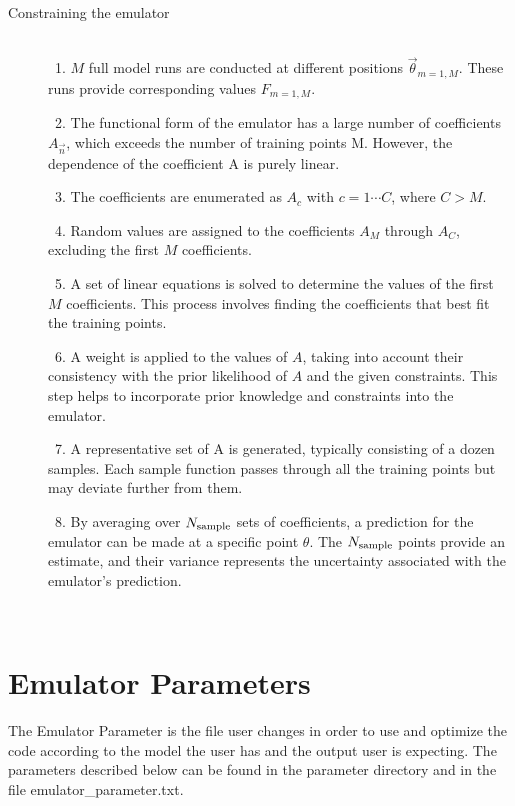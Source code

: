 \documentclass[12pt]{article}
\numberwithin{equation}{section}
\numberwithin{figure}{section}
\begin{document}
\begin{description}
\item[Constraining the emulator] \
\\
\ 1. $M$ full model runs are conducted at different positions $\vec{\theta}_{m=1,M}$. These runs provide corresponding values $F_{m=1,M}$. 

\ 2. The functional form of the emulator has a large number of coefficients $A_{\vec{n}}$, which exceeds the number of training points M. However, the dependence of the coefficient A is purely linear. 

\ 3. The coefficients are enumerated as $A_c$ with $c=1\cdots C$, where $C>M$.

\ 4. Random values are assigned to the coefficients $A_M$ through $A_C$, excluding the first $M$ coefficients. 

\ 5. A set of linear equations is solved to determine the values of the first $M$ coefficients. This process involves finding the coefficients that best fit the training points. 

\ 6. A weight is applied to the values of $A$, taking into account their consistency with the prior likelihood of $A$ and the given constraints. This step helps to incorporate prior knowledge and constraints into the emulator. 

\ 7. A representative set of A is generated, typically consisting of a dozen samples. Each sample function passes through all the training points but may deviate further from them. 

\ 8. By averaging over $N_{\rm sample}$ sets of coefficients, a prediction for the emulator can be made at a specific point $\theta$. The $N_{\rm sample}$ points provide an estimate, and their variance represents the uncertainty associated with the emulator's prediction. 

\end{description}\




\appendix


\section{Emulator Parameters}\label{sec:Emulator Parameter}

The Emulator Parameter is the file user changes in order to use and optimize the code according to the model the user has and the output user is expecting. The parameters described below can be found in the parameter directory and in the file emulator\_parameter.txt.
\end{document}
